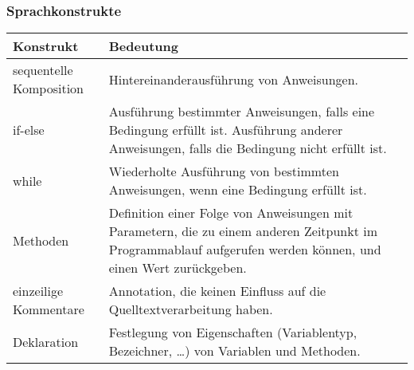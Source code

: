 \documentclass[a4paper,10pt]{article}
\begin{document}
\subsubsection{Sprachkonstrukte}
\begin{tabularx}{\textwidth}{| l | X |}
\hline
\textbf{Konstrukt} & \textbf{Bedeutung}\\
\hline
sequentelle Komposition & Hintereinanderausf\"{u}hrung von Anweisungen.\\
\hline
if-else & Ausf\"{u}hrung bestimmter Anweisungen, falls eine Bedingung erf\"{u}llt ist. Ausf\"{u}hrung anderer Anweisungen, falls die Bedingung nicht erf\"{u}llt ist.\\
\hline
while & Wiederholte Ausf\"{u}hrung von bestimmten Anweisungen, wenn eine Bedingung erf\"{u}llt ist.\\
\hline
Methoden & Definition einer Folge von Anweisungen mit Parametern, die zu einem anderen Zeitpunkt im Programmablauf aufgerufen werden k\"{o}nnen, und einen Wert zur\"{u}ckgeben.\\
\hline
einzeilige Kommentare & Annotation, die keinen Einfluss auf die Quelltextverarbeitung haben.\\
\hline
Deklaration & Festlegung von Eigenschaften (Variablentyp, Bezeichner, \ldots) von Variablen und Methoden.\\
\hline
\end{tabularx}
\end{document}
